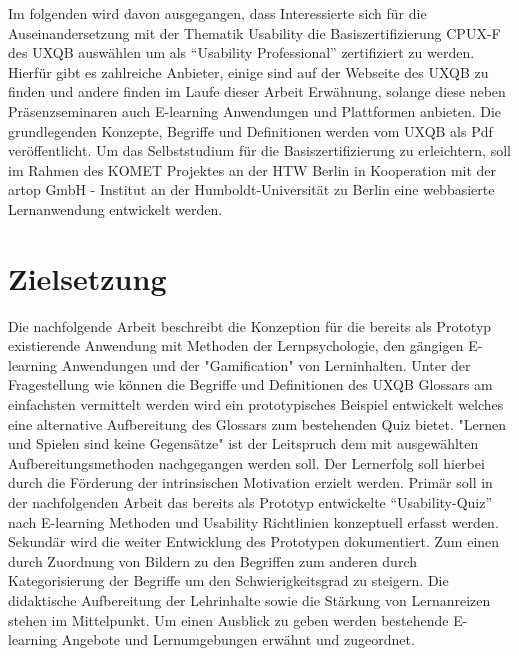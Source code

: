 \documentclass[a4paper, 12pt, twoside, BCOR=20mm, DIV=calc, abstracton, parskip=half*, toc=bibliography, toc=listof, headsepline, footsepline, headings=small, numbers=enddot]{scrreprt}
\begin{document}
	Im folgenden wird davon ausgegangen, dass Interessierte sich für die Auseinandersetzung mit der Thematik Usability die Basiszertifizierung \ac{CPUX}-F des \ac{UXQB} auswählen um als "`Usability Professional"' zertifiziert zu werden. Hierfür gibt es zahlreiche Anbieter, einige sind auf der Webseite des \ac{UXQB} zu finden und andere finden im Laufe dieser Arbeit Erwähnung,  solange diese neben Präsenzseminaren auch E-learning Anwendungen und Plattformen anbieten. 
	Die grundlegenden Konzepte, Begriffe und Definitionen werden vom \ac{UXQB} als Pdf veröffentlicht\cite{cpux-f}. Um das Selbststudium für die Basiszertifizierung zu erleichtern, soll im Rahmen des KOMET Projektes an der \ac{HTW Berlin} %
	in Kooperation mit der artop GmbH - Institut an der Humboldt-Universität zu Berlin eine webbasierte Lernanwendung entwickelt werden\cite{KOMET}. 
	
		
	\section{Zielsetzung}
	Die nachfolgende Arbeit beschreibt die Konzeption für die bereits als Prototyp existierende Anwendung mit Methoden der Lernpsychologie, den gängigen E-learning Anwendungen und der "Gamification" von Lerninhalten. Unter der Fragestellung wie können die Begriffe und Definitionen des \ac{UXQB} Glossars am einfachsten vermittelt werden wird ein prototypisches Beispiel entwickelt welches eine alternative Aufbereitung des Glossars zum bestehenden Quiz bietet. "Lernen und Spielen sind keine Gegensätze" \cite{dewey1995erfahrung}
	ist der Leitspruch dem mit ausgewählten Aufbereitungsmethoden nachgegangen werden soll. Der Lernerfolg soll hierbei durch die Förderung der intrinsischen Motivation erzielt werden. 
	Primär soll in der nachfolgenden Arbeit das bereits als Prototyp entwickelte "`Usability-Quiz"' nach E-learning Methoden und Usability Richtlinien konzeptuell erfasst werden. Sekundär wird die weiter Entwicklung des Prototypen dokumentiert. Zum einen durch Zuordnung von Bildern zu den Begriffen zum anderen durch Kategorisierung der Begriffe um den Schwierigkeitsgrad zu steigern. Die didaktische Aufbereitung der Lehrinhalte sowie die Stärkung von Lernanreizen stehen im Mittelpunkt. Um einen Ausblick zu geben werden bestehende E-learning Angebote und Lernumgebungen erwähnt und zugeordnet. 
	
\end{document}
